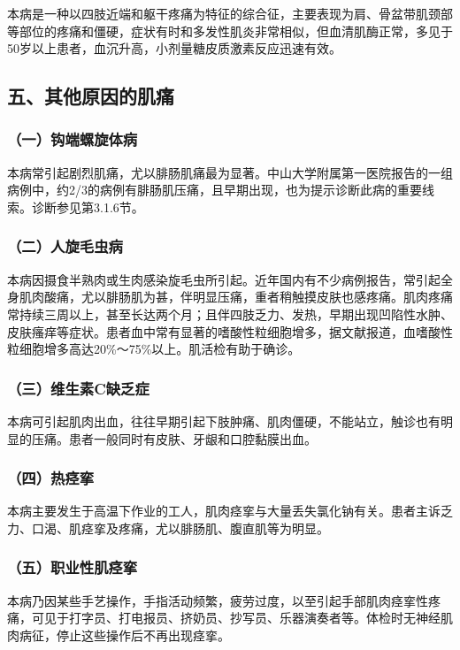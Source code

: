 本病是一种以四肢近端和躯干疼痛为特征的综合征，主要表现为肩、骨盆带肌颈部等部位的疼痛和僵硬，症状有时和多发性肌炎非常相似，但血清肌酶正常，多见于50岁以上患者，血沉升高，小剂量糖皮质激素反应迅速有效。

\subsection{五、其他原因的肌痛}

\subsubsection{（一）钩端螺旋体病}

本病常引起剧烈肌痛，尤以腓肠肌痛最为显著。中山大学附属第一医院报告的一组病例中，约2/3的病例有腓肠肌压痛，且早期出现，也为提示诊断此病的重要线索。诊断参见第3.1.6节。

\subsubsection{（二）人旋毛虫病}

本病因摄食半熟肉或生肉感染旋毛虫所引起。近年国内有不少病例报告，常引起全身肌肉酸痛，尤以腓肠肌为甚，伴明显压痛，重者稍触摸皮肤也感疼痛。肌肉疼痛常持续三周以上，甚至长达两个月；且伴四肢乏力、发热，早期出现凹陷性水肿、皮肤瘙痒等症状。患者血中常有显著的嗜酸性粒细胞增多，据文献报道，血嗜酸性粒细胞增多高达20\%～75\%以上。肌活检有助于确诊。

\subsubsection{（三）维生素C缺乏症}

本病可引起肌肉出血，往往早期引起下肢肿痛、肌肉僵硬，不能站立，触诊也有明显的压痛。患者一般同时有皮肤、牙龈和口腔黏膜出血。

\subsubsection{（四）热痉挛}

本病主要发生于高温下作业的工人，肌肉痉挛与大量丢失氯化钠有关。患者主诉乏力、口渴、肌痉挛及疼痛，尤以腓肠肌、腹直肌等为明显。

\subsubsection{（五）职业性肌痉挛}

本病乃因某些手艺操作，手指活动频繁，疲劳过度，以至引起手部肌肉痉挛性疼痛，可见于打字员、打电报员、挤奶员、抄写员、乐器演奏者等。体检时无神经肌肉病征，停止这些操作后不再出现痉挛。

